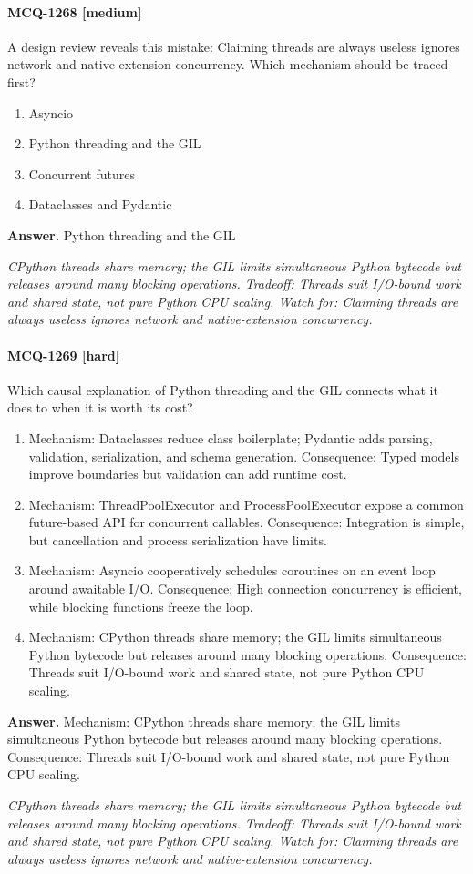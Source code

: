 \paragraph{MCQ-1268 [medium]} A design review reveals this mistake: Claiming threads are always useless ignores network and native-extension concurrency. Which mechanism should be traced first?
\begin{enumerate}[label=\Alph*.]
\item Asyncio
\item Python threading and the GIL
\item Concurrent futures
\item Dataclasses and Pydantic
\end{enumerate}
\noindent\textbf{Answer.} Python threading and the GIL
\par\textit{CPython threads share memory; the GIL limits simultaneous Python bytecode but releases around many blocking operations. Tradeoff: Threads suit I/O-bound work and shared state, not pure Python CPU scaling. Watch for: Claiming threads are always useless ignores network and native-extension concurrency.}
\paragraph{MCQ-1269 [hard]} Which causal explanation of Python threading and the GIL connects what it does to when it is worth its cost?
\begin{enumerate}[label=\Alph*.]
\item Mechanism: Dataclasses reduce class boilerplate; Pydantic adds parsing, validation, serialization, and schema generation. Consequence: Typed models improve boundaries but validation can add runtime cost.
\item Mechanism: ThreadPoolExecutor and ProcessPoolExecutor expose a common future-based API for concurrent callables. Consequence: Integration is simple, but cancellation and process serialization have limits.
\item Mechanism: Asyncio cooperatively schedules coroutines on an event loop around awaitable I/O. Consequence: High connection concurrency is efficient, while blocking functions freeze the loop.
\item Mechanism: CPython threads share memory; the GIL limits simultaneous Python bytecode but releases around many blocking operations. Consequence: Threads suit I/O-bound work and shared state, not pure Python CPU scaling.
\end{enumerate}
\noindent\textbf{Answer.} Mechanism: CPython threads share memory; the GIL limits simultaneous Python bytecode but releases around many blocking operations. Consequence: Threads suit I/O-bound work and shared state, not pure Python CPU scaling.
\par\textit{CPython threads share memory; the GIL limits simultaneous Python bytecode but releases around many blocking operations. Tradeoff: Threads suit I/O-bound work and shared state, not pure Python CPU scaling. Watch for: Claiming threads are always useless ignores network and native-extension concurrency.}

